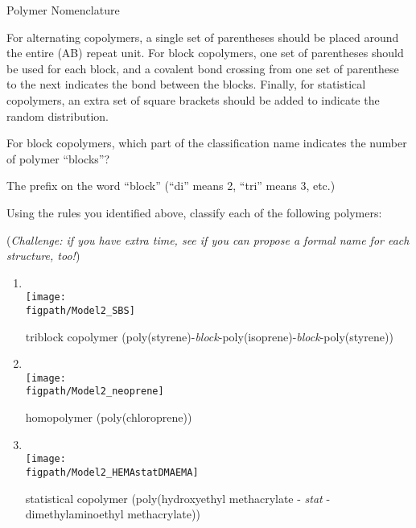 \begin{activity}{Polymer Nomenclature}
\begin{ctqs}
\begin{enumerate}
				\begin{solution}[2in]
				For alternating copolymers, a single set of parentheses should be placed around the entire (AB) repeat unit.  For block copolymers, one set of parentheses should be used for each block, and a covalent bond crossing from one set of parenthese to the next indicates the bond between the blocks.  Finally, for statistical copolymers, an extra set of square brackets should be added to indicate the random distribution.
				\end{solution}
			
		\end{enumerate}
	
	\question For block copolymers, which part of the classification name indicates the number of polymer ``blocks''?
			
				\begin{solution}[0.5in]
				The prefix on the word ``block'' (``di'' means 2, ``tri'' means 3, etc.) 
				\end{solution}
		
	\question Using the rules you identified above, classify each of the following polymers: 
	
		(\emph{Challenge: if you have extra time, see if you can propose a formal name for each structure, too!})
	
		\begin{enumerate}
			\item \text{}\\\texttt{[image: \\figpath/Model2\_SBS]}
			
				\begin{solution}[0.25in]
					triblock copolymer (poly(styrene)-\emph{block}-poly(isoprene)-\emph{block}-poly(styrene))
				\end{solution}
			
			\item \text{}\\\texttt{[image: \\figpath/Model2\_neoprene]}
			
				\begin{solution}[0.25in]
					homopolymer (poly(chloroprene))
				\end{solution}
			
			\item \text{}\\\texttt{[image: \\figpath/Model2\_HEMAstatDMAEMA]}
			
				\begin{solution}[0.25in]
					statistical copolymer (poly(hydroxyethyl methacrylate - \emph{stat} - dimethylaminoethyl methacrylate))
				\end{solution}
			

\end{enumerate}
\end{ctqs}
\end{activity}
